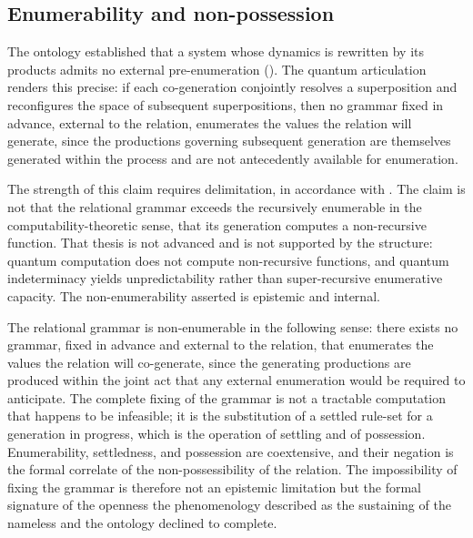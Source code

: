 \subsection{Enumerability and non-possession}
\label{p10:sec:unenumerable}

The ontology established that a system whose dynamics is rewritten by its products admits no external pre-enumeration (). The quantum articulation renders this precise: if each co-generation conjointly resolves a superposition and reconfigures the space of subsequent superpositions, then no grammar fixed in advance, external to the relation, enumerates the values the relation will generate, since the productions governing subsequent generation are themselves generated within the process and are not antecedently available for enumeration.

The strength of this claim requires delimitation, in accordance with . The claim is not that the relational grammar exceeds the recursively enumerable in the computability-theoretic sense, that its generation computes a non-recursive function. That thesis is not advanced and is not supported by the structure: quantum computation does not compute non-recursive functions, and quantum indeterminacy yields unpredictability rather than super-recursive enumerative capacity. The non-enumerability asserted is epistemic and internal.

\begin{claim}
The relational grammar is non-enumerable in the following sense: there exists no grammar, fixed in advance and external to the relation, that enumerates the values the relation will co-generate, since the generating productions are produced within the joint act that any external enumeration would be required to anticipate. The complete fixing of the grammar is not a tractable computation that happens to be infeasible; it is the substitution of a settled rule-set for a generation in progress, which is the operation of settling and of possession. Enumerability, settledness, and possession are coextensive, and their negation is the formal correlate of the non-possessibility of the relation. The impossibility of fixing the grammar is therefore not an epistemic limitation but the formal signature of the openness the phenomenology described as the sustaining of the nameless and the ontology declined to complete.
\end{claim}


